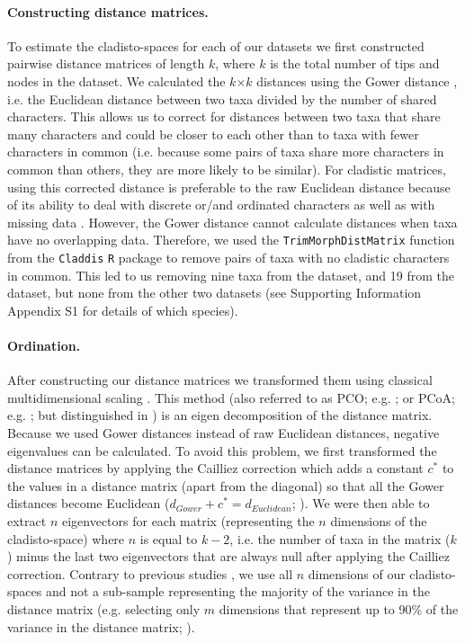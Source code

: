 \documentclass[12pt,a4paper]{article}
\begin{document}
\paragraph{Constructing distance matrices.}
To estimate the cladisto-spaces for each of our datasets we first constructed pairwise distance matrices of length $k$, where $k$ is the total number of tips and nodes in the dataset.
We calculated the $k$$\times$$k$ distances using the Gower distance \citep{Gower71}, i.e. the Euclidean distance between two taxa divided by the number of shared characters. 
This allows us to correct for distances between two taxa that share many characters and could be closer to each other than to taxa with fewer characters in common (i.e. because some pairs of taxa share more characters in common than others, they are more likely to be similar).
For cladistic matrices, using this corrected distance is preferable to the raw Euclidean distance because of its ability to deal with discrete or/and ordinated characters as well as with missing data \citep{anderson2012using}.
However, the Gower distance cannot calculate distances when taxa have no overlapping data.
Therefore, we used the \texttt{TrimMorphDistMatrix} function from the \texttt{Claddis} \texttt{R} package to remove pairs of taxa with no cladistic characters in common.
This led to us removing nine taxa from the \cite{bapst2016topology} dataset, and 19 from the \cite{brusatte2014gradual} dataset, but none from the other two datasets (see Supporting Information Appendix S1 for details of which species). 

\paragraph{Ordination.}
After constructing our distance matrices we transformed them using classical multidimensional scaling \citep[MDS;][]{torgerson1965multidimensional,GOWER01121966,cailliez1983analytical}.
This method (also referred to as PCO; e.g. \citealt{Brusatte2015}; or PCoA; e.g. \citealt{paradisape:2004}; but distinguished in \citealt{legendre2012numerical}) is an eigen decomposition of the distance matrix.
Because we used Gower distances instead of raw Euclidean distances, negative eigenvalues can be calculated.
To avoid this problem, we first transformed the distance matrices by applying the Cailliez correction \citep{cailliez1983analytical} which adds a constant $c^*$ to the values in a distance matrix (apart from the diagonal) so that all the Gower distances become Euclidean ($d_{Gower}+c^*=d_{Euclidean}$; \citealt{cailliez1983analytical}). 
We were then able to extract $n$ eigenvectors for each matrix (representing the $n$ dimensions of the cladisto-space) where $n$ is equal to $k-2$, i.e. the number of taxa in the matrix ($k$) minus the last two eigenvectors that are always null after applying the Cailliez correction.
Contrary to previous studies \citep[e.g][]{brusatte50,cisneros2010,prentice2011,anderson2012using,Hughes20082013,bentonmodels2014}, we use all $n$ dimensions of our cladisto-spaces and not a sub-sample representing the majority of the variance in the distance matrix (e.g. selecting only $m$ dimensions that represent up to 90\% of the variance in the distance matrix; \citealt{Brusatte12092008,toljagictriassic-jurassic2013}).
\end{document}

